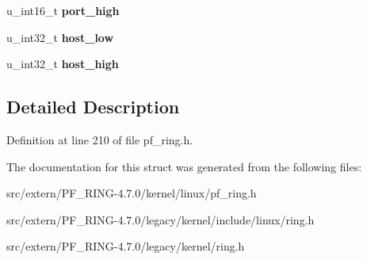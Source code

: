 \begin{DoxyCompactItemize}
\item 
\hypertarget{structfiltering__rule__core__fields_aa9257d5b8a2b4c0fa89199a60d69f32d}{
u\_\-int16\_\-t {\bfseries port\_\-high}}
\label{structfiltering__rule__core__fields_aa9257d5b8a2b4c0fa89199a60d69f32d}

\item 
\hypertarget{structfiltering__rule__core__fields_a2cc3429380e5c94995eb68f74ce4f99f}{
u\_\-int32\_\-t {\bfseries host\_\-low}}
\label{structfiltering__rule__core__fields_a2cc3429380e5c94995eb68f74ce4f99f}

\item 
\hypertarget{structfiltering__rule__core__fields_af89ba1f278975defdc11541256b8b785}{
u\_\-int32\_\-t {\bfseries host\_\-high}}
\label{structfiltering__rule__core__fields_af89ba1f278975defdc11541256b8b785}

\end{DoxyCompactItemize}


\subsection{Detailed Description}


Definition at line 210 of file pf\_\-ring.h.



The documentation for this struct was generated from the following files:\begin{DoxyCompactItemize}
\item 
src/extern/PF\_\-RING-\/4.7.0/kernel/linux/pf\_\-ring.h\item 
src/extern/PF\_\-RING-\/4.7.0/legacy/kernel/include/linux/ring.h\item 
src/extern/PF\_\-RING-\/4.7.0/legacy/kernel/ring.h\end{DoxyCompactItemize}
